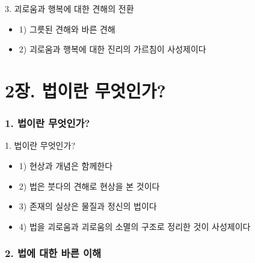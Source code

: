 \documentclass[aspectratio=1610,14pt,xcolor=pdftex,dvipsnames,table,handout]{beamer}
\begin{document}
		\begin{frame} [t,plain]
			\begin{block} {3. 괴로움과 행복에 대한 견해의 전환}
			\begin{itemize}
				\item 1) 그릇된 견해와 바른 견해
				\item 2) 괴로움과 행복에 대한 진리의 가르침이 사성제이다
			\end{itemize}
			\end{block}
		\end{frame}



		\part{2장. 법이란 무엇인가?}
		\frame{\partpage}


		\section{1. 법이란 무엇인가?}
		\frame [plain] {\sectionpage}

		\begin{frame} [t,plain]
			\begin{block} {1. 법이란 무엇인가?}
			\begin{itemize}
				\item 1) 현상과 개념은 함께한다
				\item 2) 법은 붓다의 견해로 현상을 본 것이다
				\item 3) 존재의 실상은 물질과 정신의 법이다
				\item 4) 법을 괴로움과 괴로움의 소멸의 구조로 정리한 것이 사성제이다
			\end{itemize}
			\end{block}
		\end{frame}

		\section{2. 법에 대한 바른 이해}
		\frame [plain] {\sectionpage}
\end{document}
